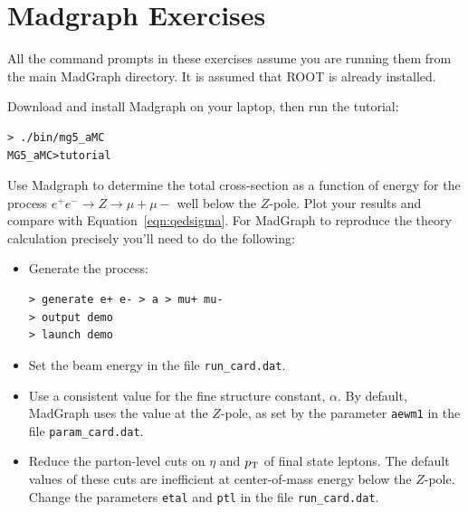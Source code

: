 \documentclass[12pt]{article}
\begin{document}
\section{Madgraph Exercises}

All the command prompts in these exercises assume you are running them from the main MadGraph directory.  It is assumed that ROOT is already installed.
\begin{Exercise}
Download and install Madgraph on your laptop, then run the tutorial:
\begin{verbatim}
> ./bin/mg5_aMC
MG5_aMC>tutorial
\end{verbatim}
\end{Exercise}

\begin{Exercise}
Use Madgraph to determine the total cross-section as a function of energy for the process $e^+ e^- \to Z \to \mu+ \mu-$ well below the $Z$-pole.  Plot your results and compare with Equation~\ref{eqn:qedsigma}.  For MadGraph to reproduce the theory calculation precisely you'll need to do the following:
\begin{itemize}
\item Generate the process:
\begin{verbatim}
> generate e+ e- > a > mu+ mu-
> output demo
> launch demo
\end{verbatim}
\item Set the beam energy in the file {\tt run\_card.dat}.
\item Use a consistent value for the fine structure constant, $\alpha$.  By default, MadGraph uses the value at the $Z$-pole, as set by the parameter {\tt aewm1} in the file {\tt param\_card.dat}. 
\item Reduce the parton-level cuts on $\eta$ and $p_{\rm T}$ of final state leptons.  The default values of these cuts are inefficient at center-of-mass energy below the $Z$-pole.  Change the parameters {\tt etal} and {\tt ptl} in the file {\tt run\_card.dat}.
\end{itemize}
\end{Exercise}
\end{document}
